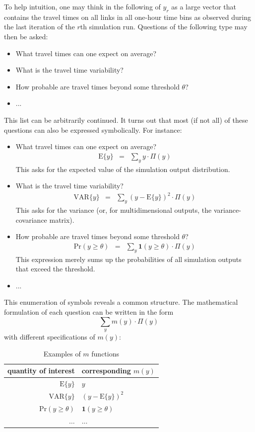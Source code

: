 To help intuition, one may think in the following of $y_{r}$ as a
large vector that contains the travel times on all links in all one-hour
time bins as observed during the last iteration of the $r$th simulation
run. Questions of the following type may then be asked:
\begin{itemize}
\item What travel times can one expect on average?
\item What is the travel time variability?
\item How probable are travel times beyond some threshold $\theta$?
\item ...
\end{itemize}
This list can be arbitrarily continued. It turns out that most (if
not all) of these questions can also be expressed symbolically. For
instance:
\begin{itemize}
\item What travel times can one expect on average?
\begin{eqnarray}
\text{E}\{y\} & = & \sum_{y}y\cdot\Pi(y)\label{eq:question-exp}
\end{eqnarray}
This asks for the expected value of the simulation output distribution.
\item What is the travel time variability?
\begin{eqnarray}
\text{VAR}\{y\} & = & \sum_{y}(y-\text{E}\{y\})^{2}\cdot\Pi(y)\label{eq:question-var}
\end{eqnarray}
This asks for the variance (or, for multidimensional outputs, the
variance-covariance matrix).
\item How probable are travel times beyond some threshold $\theta$?
\begin{eqnarray}
\text{Pr}(y\geq\theta) & = & \sum_{y}\mathbf{1}(y\geq\theta)\cdot\Pi(y)\label{eq:question-proba}
\end{eqnarray}
This expression merely sums up the probabilities of all simulation
outputs that exceed the threshold.
\item ...
\end{itemize}
This enumeration of symbols reveals a common structure. The mathematical
formulation of each question can be written in the form
\begin{equation}
\sum_{y}m(y)\cdot\Pi(y)\label{eq:exp-of-m}
\end{equation}
with different specifications of $m(y)$:

\begin{center}
\begin{table}[H]
\caption{\label{tab:Examples-of-m}Examples of $m$ functions}


\centering{}%
\begin{tabular}{r|l}
\hline 
quantity of interest & corresponding $m(y)$ \tabularnewline
\hline 
$\text{E}\{y\}$ & $y$\tabularnewline
$\text{VAR}\{y\}$ & $(y-\text{E}\{y\})^{2}$\tabularnewline
$\text{Pr}(y\geq\theta)$ & $\mathbf{1}(y\geq\theta)$\tabularnewline
$\ldots$ & $\ldots$\tabularnewline
\hline 
\end{tabular}
\end{table}

\par\end{center}

